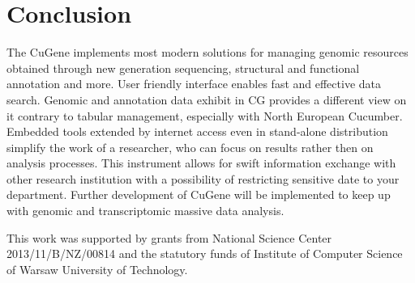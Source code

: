 \documentclass[]{spie}
\newcommand{\appName}{CuGene}
\newcommand{\appShortcut}{CG}
\begin{document}
\section{Conclusion}

The \appName{} implements most modern solutions for managing genomic resources obtained through new generation sequencing,
structural and functional annotation and more.
User friendly interface enables fast and effective data search.
Genomic and annotation data exhibit in \appShortcut{} provides a different view on it contrary to tabular management, especially with North European Cucumber.
Embedded tools extended by internet access even in stand-alone distribution simplify the work of a researcher,
who can focus on results rather then on analysis processes.
This instrument allows for swift information exchange with other research institution with a possibility of restricting sensitive date to your department.
Further development of \appName{} will be implemented to keep up with genomic and transcriptomic massive data analysis.

\acknowledgments

This work was supported by grants from National Science Center 2013/11/B/NZ/00814 and the statutory funds of Institute of Computer Science of Warsaw University of Technology.



\end{document}
